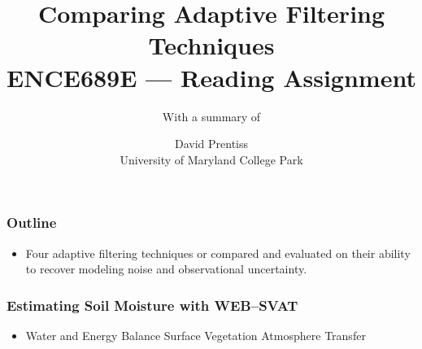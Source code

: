 \documentclass{beamer}
\begin{document}
\nobibliography*
\title{Comparing Adaptive Filtering Techniques \\ ENCE689E --- Reading Assignment}
\author{David Prentiss \\ University of Maryland College Park}
\subtitle{With a summary of \\ }
\frame{\titlepage}
\begin{frame}
  \frametitle{Outline}
  \begin{itemize}
    \item Four adaptive filtering techniques or compared and evaluated on their ability to recover modeling noise and observational uncertainty.
  \end{itemize}
\end{frame}
\begin{frame}
  \frametitle{Estimating Soil Moisture with WEB--SVAT}
  \begin{itemize}
    \item Water and Energy Balance Surface Vegetation Atmosphere Transfer
  \end{itemize}
\end{frame}


\end{document}
